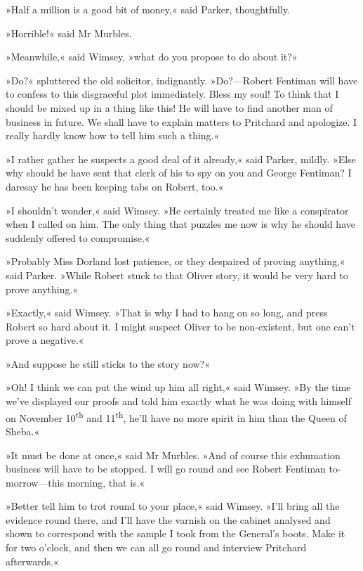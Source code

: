 »Half a million is a good bit of money,« said Parker, thoughtfully.

»Horrible!« said Mr Murbles.

»Meanwhile,« said Wimsey, »what do you propose to do about it?«

»Do?« spluttered the old solicitor, indignantly. »Do?---Robert Fentiman will have to confess to this disgraceful plot immediately. Bless my soul! To think that I should be mixed up in a thing like this! He will have to find another man of business in future. We shall have to explain matters to Pritchard and apologize. I really hardly know how to tell him such a thing.«

»I rather gather he suspects a good deal of it already,« said Parker, mildly. »Else why should he have sent that clerk of his to spy on you and George Fentiman? I daresay he has been keeping tabs on Robert, too.«

»I shouldn't wonder,« said Wimsey. »He certainly treated me like a conspirator when I called on him. The only thing that puzzles me now is why he should have suddenly offered to compromise.«

»Probably Miss Dorland lost patience, or they despaired of proving anything,« said Parker. »While Robert stuck to that Oliver story, it would be very hard to prove anything.«

»Exactly,« said Wimsey. »That is why I had to hang on so long, and press Robert so hard about it. I might suspect Oliver to be non-existent, but one can't prove a negative.«

»And suppose he still sticks to the story now?«

»Oh! I think we can put the wind up him all right,« said Wimsey. »By the time we've displayed our proofs and told him exactly what he was doing with himself on November  10\textsuperscript{th} and  11\textsuperscript{th}, he'll have no more spirit in him than the Queen of Sheba.«

»It must be done at once,« said Mr Murbles. »And of course this exhumation business will have to be stopped. I will go round and see Robert Fentiman to-morrow\allowbreak---\allowbreak this morning, that is.«

»Better tell him to trot round to your place,« said Wimsey. »I'll bring all the evidence round there, and I'll have the varnish on the cabinet analysed and shown to correspond with the sample I took from the General's boots. Make it for two o'clock, and then we can all go round and interview Pritchard afterwards.«

